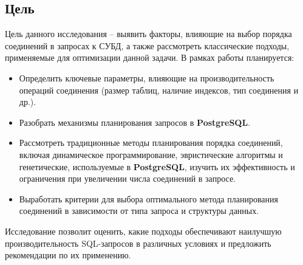\documentclass[12pt]{article}
\begin{document}
\begin{flushleft}
\centering \subsection*{Цель}
\raggedright
Цель данного исследования – выявить факторы, влияющие на выбор порядка 
соединений в запросах к СУБД, а также рассмотреть классические подходы, применяемые для оптимизации данной задачи.
В рамках работы планируется:
\begin{itemize}
    \item Определить ключевые параметры, влияющие на производительность 
    операций соединения (размер таблиц, наличие индексов, тип соединения и др.).
    \item Разобрать механизмы планирования запросов в \textbf{PostgreSQL}.
    \item Рассмотреть традиционные методы планирования порядка соединений, 
    включая динамическое программирование, эвристические алгоритмы и генетические, 
    используемые в \textbf{PostgreSQL}, изучить их эффективность и ограничения 
    при увеличении числа соединений в запросе.
    \item Выработать критерии для выбора оптимального метода планирования соединений
    в зависимости от типа запроса и структуры данных.
\end{itemize}

Исследование позволит оценить, какие подходы обеспечивают наилучшую 
производительность SQL-запросов в различных условиях и предложить рекомендации 
по их применению. 



\end{flushleft}
\end{document}
